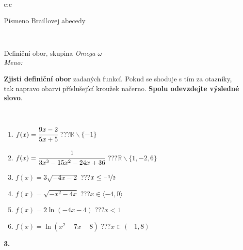 \documentclass[10pt]{report}
\begin{document}
\begin{tabular}{c:c}
\begin{minipage}[c][104.5mm][t]{0.5\linewidth}
\begin{center}
\begin{minipage}{0.20\linewidth}
\begin{center}
{\small Písmeno Braillovej abecedy}
\end{center}
\end{minipage}
\end{center}
\end{minipage}
\\ \hdashline
\begin{minipage}[c][104.5mm][t]{0.5\linewidth}
\begin{center}
\vspace{7mm}
{\huge Definiční obor, skupina \textit{Omega $\omega$} -}\\[5mm]
\textit{Meno:}\phantom{xxxxxxxxxxxxxxxxxxxxxxxxxxxxxxxxxxxxxxxxxxxxxxxxxxxxxxxxxxxxxxxxx}\\[5mm]
\begin{minipage}{0.95\linewidth}
\textbf{Zjisti definiční obor} zadaných funkcí. Pokud se shoduje s tím za otazníky,\\tak napravo obarvi příslušející kroužek načerno. \textbf{Spolu odevzdejte výsledné slovo}.
\end{minipage}
\\[1mm]
\begin{minipage}{0.79\linewidth}
\begin{center}
\begin{varwidth}{\linewidth}
\begin{enumerate}
\normalsizerrr
\item $f(x)=\cfrac{9x-2}{5x+5}$\quad \dotfill\; ???\;\dotfill \quad $\mathbb{R}\smallsetminus\{-1\}$
\item $f(x)=\cfrac{1}{3x^3-15x^2-24x+36}$\quad \dotfill\; ???\;\dotfill \quad $\mathbb{R}\smallsetminus\{1,-2,6\}$
\item $f(x)=3\sqrt{-4x-2}$\quad \dotfill\; ???\;\dotfill \quad $x\leq\nicefrac{-1}{2}$
\item $f(x)=\sqrt{-x^2-4x}$\quad \dotfill\; ???\;\dotfill \quad $x\in\langle-4 , 0\rangle$
\item $f(x)=2\ln{(-4x-4)}$\quad \dotfill\; ???\;\dotfill \quad $x<1$
\item $f(x)=\ln{(x^2-7x-8)}$\quad \dotfill\; ???\;\dotfill \quad $x\in(-1 , 8)$
\end{enumerate}
\end{varwidth}
\end{center}
\end{minipage}
\begin{minipage}{0.20\linewidth}
\begin{center}
{\Huge\bfseries 3.} \\[2mm]

\end{center}
\end{minipage}
\end{center}
\end{minipage}
\end{tabular}
\end{document}
